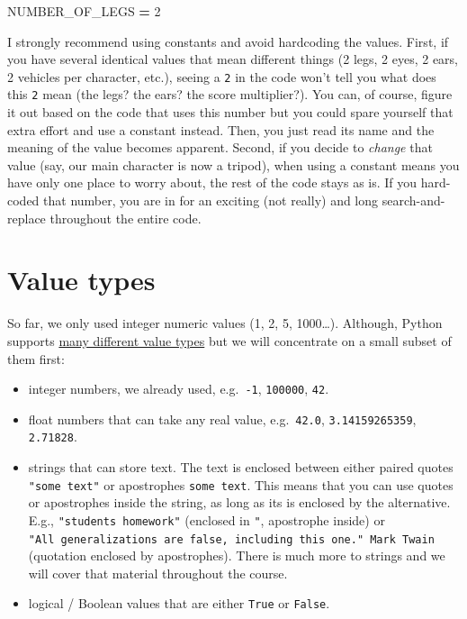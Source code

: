 \documentclass[
]{book}
\newenvironment{Shaded}{\begin{snugshade}}{\end{snugshade}}
\newcommand{\DecValTok}[1]{\textcolor[rgb]{0.00,0.00,0.81}{#1}}
\newcommand{\NormalTok}[1]{#1}
\newcommand{\OperatorTok}[1]{\textcolor[rgb]{0.81,0.36,0.00}{\textbf{#1}}}
\providecommand{\tightlist}{%
  \setlength{\itemsep}{0pt}\setlength{\parskip}{0pt}}
\begin{document}
\begin{Shaded}
\begin{Highlighting}[]
\NormalTok{NUMBER\_OF\_LEGS }\OperatorTok{=} \DecValTok{2}
\end{Highlighting}
\end{Shaded}

I strongly recommend using constants and avoid hardcoding the values. First, if you have several identical values that mean different things (2 legs, 2 eyes, 2 ears, 2 vehicles per character, etc.), seeing a \texttt{2} in the code won't tell you what does this \texttt{2} mean (the legs? the ears? the score multiplier?). You can, of course, figure it out based on the code that uses this number but you could spare yourself that extra effort and use a constant instead. Then, you just read its name and the meaning of the value becomes apparent. Second, if you decide to \emph{change} that value (say, our main character is now a tripod), when using a constant means you have only one place to worry about, the rest of the code stays as is. If you hard-coded that number, you are in for an exciting (not really) and long search-and-replace throughout the entire code.

\hypertarget{value-types}{%
\section{Value types}\label{value-types}}

So far, we only used integer numeric values (1, 2, 5, 1000\ldots). Although, Python supports \href{https://docs.python.org/3/library/stdtypes.html}{many different value types} but we will concentrate on a small subset of them first:

\begin{itemize}
\tightlist
\item
  integer numbers, we already used, e.g.~\texttt{-1}, \texttt{100000}, \texttt{42}.
\item
  float numbers that can take any real value, e.g.~\texttt{42.0}, \texttt{3.14159265359}, \texttt{2.71828}.
\item
  strings that can store text. The text is enclosed between either paired quotes \texttt{"some\ text"} or apostrophes \texttt{\textquotesingle{}some\ text\textquotesingle{}}. This means that you can use quotes or apostrophes inside the string, as long as its is enclosed by the alternative. E.g., \texttt{"students\textquotesingle{}\ homework"} (enclosed in \texttt{"}, apostrophe \texttt{\textquotesingle{}} inside) or \texttt{\textquotesingle{}"All\ generalizations\ are\ false,\ including\ this\ one."\ Mark\ Twain\textquotesingle{}} (quotation enclosed by apostrophes). There is much more to strings and we will cover that material throughout the course.
\item
  logical / Boolean values that are either \texttt{True} or \texttt{False}.
\end{itemize}
\end{document}
